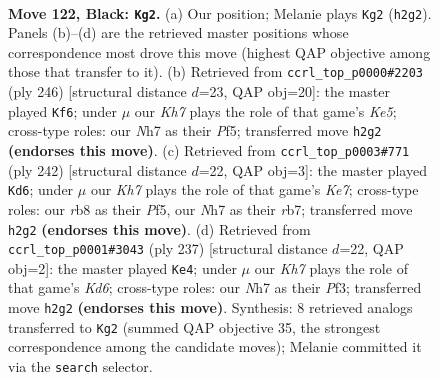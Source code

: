 \documentclass[11pt]{article}
\begin{document}
\clearpage

\begin{figure}[p]\centering
\begin{subfigure}{0.46\textwidth}\centering
\resizebox{\linewidth}{!}{%
\newchessgame
\chessboard[
  setfen={1R6/3r3n/8/4p2p/7b/8/3p3k/3K4 b - - 9 122},
  showmover=false,
  pgfstyle=straightmove, color=movearrow, markmove={h2-g2}
]}
\caption{}
\end{subfigure}\hfill
\begin{subfigure}{0.46\textwidth}\centering
\resizebox{\linewidth}{!}{%
\newchessgame
\chessboard[
  setfen={8/7k/7P/4KP2/8/8/7R/1r6 w - - 63 124},
  showmover=false,
  pgfstyle=straightmove, color=movearrow, markmove={e5-f6}
]}
\caption{}
\end{subfigure}
\\[4pt]
\begin{subfigure}{0.46\textwidth}\centering
\resizebox{\linewidth}{!}{%
\newchessgame
\chessboard[
  setfen={8/1r2K2k/7P/5P2/8/8/8/7R w - - 71 122},
  showmover=false,
  pgfstyle=straightmove, color=movearrow, markmove={e7-d6}
]}
\caption{}
\end{subfigure}\hfill
\begin{subfigure}{0.46\textwidth}\centering
\resizebox{\linewidth}{!}{%
\newchessgame
\chessboard[
  setfen={8/8/7r/8/8/R2k1p1p/7K/8 b - - 15 119},
  showmover=false,
  pgfstyle=straightmove, color=movearrow, markmove={d3-e4}
]}
\caption{}
\end{subfigure}
\caption{\textbf{Move 122, Black: \texttt{Kg2}.} (a) Our position; Melanie plays \texttt{Kg2} (\texttt{h2g2}). Panels (b)--(d) are the retrieved master positions whose correspondence most drove this move (highest QAP objective among those that transfer to it). (b) Retrieved from \texttt{ccrl\_top\_p0000\#2203} (ply 246) [structural distance $d$=23, QAP obj=20]: the master played \texttt{Kf6}; under $\mu$ our \emph{Kh7} plays the role of that game's \emph{Ke5}; cross-type roles: our \emph{N}h7 as their \emph{P}f5; transferred move \texttt{h2g2} \textbf{(endorses this move)}. (c) Retrieved from \texttt{ccrl\_top\_p0003\#771} (ply 242) [structural distance $d$=22, QAP obj=3]: the master played \texttt{Kd6}; under $\mu$ our \emph{Kh7} plays the role of that game's \emph{Ke7}; cross-type roles: our \emph{r}b8 as their \emph{P}f5, our \emph{N}h7 as their \emph{r}b7; transferred move \texttt{h2g2} \textbf{(endorses this move)}. (d) Retrieved from \texttt{ccrl\_top\_p0001\#3043} (ply 237) [structural distance $d$=22, QAP obj=2]: the master played \texttt{Ke4}; under $\mu$ our \emph{Kh7} plays the role of that game's \emph{Kd6}; cross-type roles: our \emph{N}h7 as their \emph{P}f3; transferred move \texttt{h2g2} \textbf{(endorses this move)}. Synthesis: 8 retrieved analogs transferred to \texttt{Kg2} (summed QAP objective 35, the strongest correspondence among the candidate moves); Melanie committed it via the \texttt{search} selector.}
\label{fig:thought-m243}
\end{figure}
\end{document}
